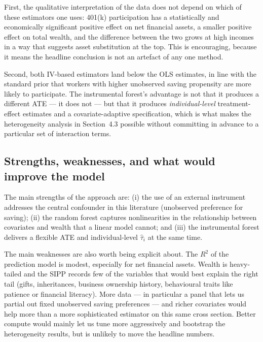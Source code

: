 \documentclass[11pt]{article}
\begin{document}
First, the qualitative interpretation of the data does not depend on which
of these estimators one uses: 401(k) participation has a statistically and
economically significant positive effect on net financial assets, a smaller
positive effect on total wealth, and the difference between the two grows
at high incomes in a way that suggests asset substitution at the top.  This
is encouraging, because it means the headline conclusion is not an artefact
of any one method.

Second, both IV-based estimators land below the OLS estimates, in line with
the standard prior that workers with higher unobserved saving propensity
are more likely to participate.  The instrumental forest's advantage is not
that it produces a different ATE --- it does not --- but that it produces
\emph{individual-level} treatment-effect estimates and a covariate-adaptive
specification, which is what makes the heterogeneity analysis in
Section~4.3 possible without committing in advance to a particular set of
interaction terms.

\subsection{Strengths, weaknesses, and what would improve the model}

The main strengths of the approach are: (i) the use of an external
instrument addresses the central confounder in this literature
(unobserved preference for saving); (ii) the random forest captures
nonlinearities in the relationship between covariates and wealth that a
linear model cannot; and (iii) the instrumental forest delivers a flexible
ATE and individual-level $\hat\tau_i$ at the same time.

The main weaknesses are also worth being explicit about.  The $R^2$ of the
prediction model is modest, especially for net financial assets.  Wealth is
heavy-tailed and the SIPP records few of the variables that would best
explain the right tail (gifts, inheritances, business ownership history,
behavioural traits like patience or financial literacy).  More data --- in
particular a panel that lets us partial out fixed unobserved saving
preferences --- and richer covariates would help more than a more
sophisticated estimator on this same cross section.  Better compute would
mainly let us tune more aggressively and bootstrap the heterogeneity
results, but is unlikely to move the headline numbers.
\end{document}
